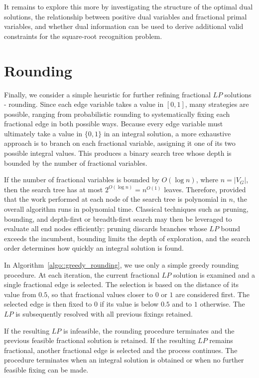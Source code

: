 \documentclass[11pt]{report}
\begin{document}
It remains to explore this more by investigating the structure of the optimal dual solutions, the relationship between positive dual variables and fractional primal variables, and whether dual information can be used to derive additional valid constraints for the square-root recognition problem.

\section{Rounding} \label{sec::rounding}

Finally, we consider a simple heuristic for further refining fractional $LP$ solutions - rounding. Since each edge variable takes a value in $[0,1]$,  many strategies are possible, ranging from probabilistic rounding to systematically fixing each fractional edge in both possible ways. Because every edge variable must ultimately take a value in $\{0,1\}$ in an integral solution, a more exhaustive approach is to branch on each fractional variable, assigning it one of its two possible integral values. This produces a binary search tree whose depth is bounded by the number of fractional variables.

If the number of fractional variables is bounded by $O(\log n)$, where $n=|V_G|$, then the search tree has at most $2^{O(\log n)}=n^{O(1)}$ leaves. Therefore, provided that the work performed at each node of the search tree is polynomial in $n$, the overall algorithm runs in polynomial time. Classical techniques such as pruning, bounding, and depth-first or breadth-first search may then be leveraged to evaluate all end nodes efficiently: pruning discards branches whose $LP$ bound exceeds the incumbent, bounding limits the depth of exploration, and the search order determines how quickly an integral solution is found. 

In Algorithm~\ref{algo::greedy_rounding}, we use only a simple greedy rounding procedure. At each iteration, the current fractional $LP$ solution is examined and a single fractional edge is selected. The selection is based on the distance of its value from $0.5$, so that fractional values closer to $0$ or $1$ are considered first. The selected edge is then fixed to $0$ if its value is below $0.5$ and to $1$ otherwise. The $LP$ is subsequently resolved with all previous fixings retained.

If the resulting $LP$ is infeasible, the rounding procedure terminates and the previous feasible fractional solution is retained. If the resulting $LP$ remains fractional, another fractional edge is selected and the process continues. The procedure terminates when an integral solution is obtained or when no further feasible fixing can be made.
\end{document}
